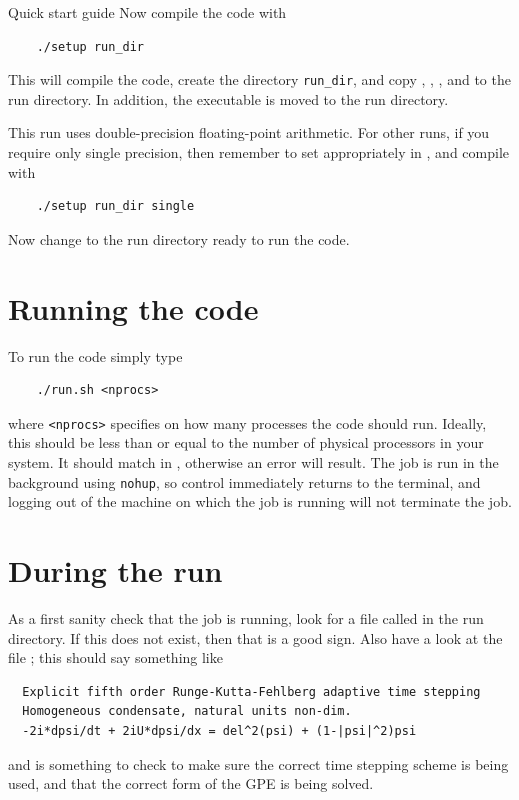 \begin{chapter}{\label{cha:quickstart} Quick start guide}
  Now compile the code with
  \begin{Verbatim}
    ./setup run_dir
  \end{Verbatim}
  This will compile the code, create the directory \verb"run_dir", and copy
  , , , and
   to the run directory.  In addition, the executable
   is moved to the run directory.

  This run uses double-precision floating-point arithmetic.  For other runs, if
  you require only single precision, then remember to set 
  appropriately in , and compile with
  \begin{Verbatim}
    ./setup run_dir single
  \end{Verbatim}
  Now change to the run directory ready to run the code.

  \section{Running the code}
  To run the code simply type
  \begin{Verbatim}
    ./run.sh <nprocs>
  \end{Verbatim}
  where \verb"<nprocs>" specifies on how many processes the code should run.
  Ideally, this should be less than or equal to the number of physical
  processors in your system.  It should match  in
  , otherwise an error will result.  The job is run in
  the background using \verb"nohup", so control immediately returns to the
  terminal, and logging out of the machine on which the job is running will not
  terminate the job.

  \section{During the run}
  As a first sanity check that the job is running, look for a file called
   in the run directory.  If this does not exist, then that is a
  good sign.  Also have a look at the file ; this should say
  something like
  \begin{Verbatim}
  Explicit fifth order Runge-Kutta-Fehlberg adaptive time stepping
  Homogeneous condensate, natural units non-dim.
  -2i*dpsi/dt + 2iU*dpsi/dx = del^2(psi) + (1-|psi|^2)psi
  \end{Verbatim}
  and is something to check to make sure the correct time stepping scheme is
  being used, and that the correct form of the GPE is being solved.


\end{chapter}
